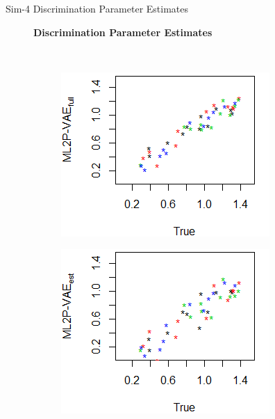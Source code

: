 \documentclass{beamer}
\theoremstyle{definition}
\newcommand*{\figuretitle}[1]{
  {\centering\scriptsize{
  \textbf{#1}
  \par\medskip}}
}
\begin{document}
\begin{frame}{Sim-4 Discrimination Parameter Estimates}
\begin{figure}[h]
\centering
\figuretitle{Discrimination Parameter Estimates}\\
    \begin{subfigure}{.32\textwidth}
      \centering
      \includegraphics[width=.9\linewidth]{../img/ml_journal_results/4skills/vae_full_disc_4skills_cropped.png}
    \end{subfigure}
    \begin{subfigure}{.32\textwidth}
      \centering
      \includegraphics[width=.9\linewidth]{../img/ml_journal_results/4skills/vae_est_disc_4skills_cropped.png}
    \end{subfigure}
    \begin{subfigure}{.32\textwidth}

\end{subfigure}
\end{figure}
\end{frame}
\end{document}
